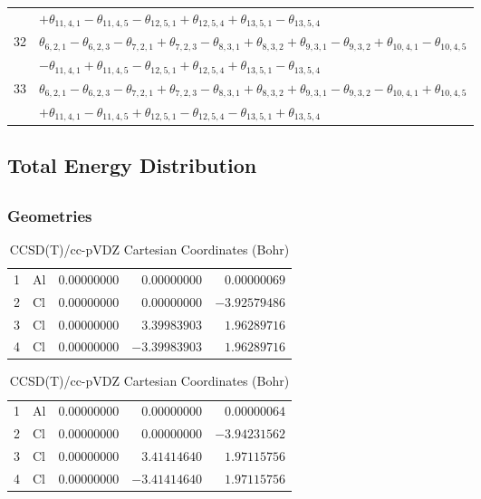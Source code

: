 \documentclass[10pt,oneside]{article}
\begin{document}
\begin{table}[h!]
\begin{tabular}{ll}
 & $ + \theta_{11,4,1} - \theta_{11,4,5} - \theta_{12,5,1} + \theta_{12,5,4} + \theta_{13,5,1} - \theta_{13,5,4}$ \\
  32  & $\theta_{6,2,1} - \theta_{6,2,3} - \theta_{7,2,1} + \theta_{7,2,3} - \theta_{8,3,1} + \theta_{8,3,2} + \theta_{9,3,1} - \theta_{9,3,2} + \theta_{10,4,1} - \theta_{10,4,5}$ \\
 & $ - \theta_{11,4,1} + \theta_{11,4,5} - \theta_{12,5,1} + \theta_{12,5,4} + \theta_{13,5,1} - \theta_{13,5,4}$ \\
  33  & $\theta_{6,2,1} - \theta_{6,2,3} - \theta_{7,2,1} + \theta_{7,2,3} - \theta_{8,3,1} + \theta_{8,3,2} + \theta_{9,3,1} - \theta_{9,3,2} - \theta_{10,4,1} + \theta_{10,4,5}$ \\
 & $ + \theta_{11,4,1} - \theta_{11,4,5} + \theta_{12,5,1} - \theta_{12,5,4} - \theta_{13,5,1} + \theta_{13,5,4}$ \\
\bottomrule
\end{tabular}
\end{table}

\begin{table}
\subsection*{Total Energy Distribution}
\centering\end{table}

\clearpage

\subsection{}

\begin{table}[h!]
\subsubsection*{Geometries}
\begin{multicols}{2}
\centering
\caption{CCSD(T)/cc-pVTZ Cartesian Coordinates (Bohr)}
\begin{tabular}{llrrr}
\toprule
1  & Al & $ 0.00000000$ & $ 0.00000000$ & $ 0.00000069$ \\
2  & Cl & $ 0.00000000$ & $ 0.00000000$ & $-3.92579486$ \\
3  & Cl & $ 0.00000000$ & $ 3.39983903$ & $ 1.96289716$ \\
4  & Cl & $ 0.00000000$ & $-3.39983903$ & $ 1.96289716$ \\
\bottomrule
\end{tabular}
\caption{CCSD(T)/cc-pVDZ Cartesian Coordinates (Bohr)}
\begin{tabular}{llrrr}
\toprule
1  & Al & $ 0.00000000$ & $ 0.00000000$ & $ 0.00000064$ \\
2  & Cl & $ 0.00000000$ & $ 0.00000000$ & $-3.94231562$ \\
3  & Cl & $ 0.00000000$ & $ 3.41414640$ & $ 1.97115756$ \\
4  & Cl & $ 0.00000000$ & $-3.41414640$ & $ 1.97115756$ \\
\bottomrule
\end{tabular}
\end{multicols}
\end{table}
\end{document}
